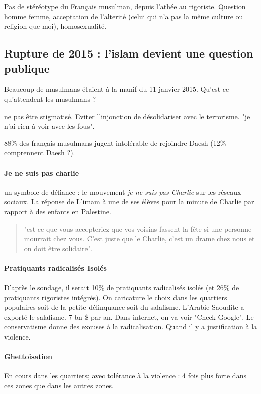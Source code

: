 \begin{Synthesis}
Pas de stéréotype du Français musulman, depuis l'athée au rigoriste. Question homme femme, acceptation de l'alterité (celui qui n'a pas la même culture ou religion que moi), homosexualité. 
\end{Synthesis}


\subsection{Rupture de 2015 : l'islam devient une question publique}

Beaucoup de musulmans étaient à la manif du 11 janvier 2015. 
Qu'est ce qu'attendent les musulmans ?
\bi
\item ne pas être stigmatisé. Eviter l'injonction de désolidariser avec le terrorisme. "je n'ai rien à voir avec les fous".
\item 88\% des français musulmans jugent intolérable de rejoindre Daesh (12\% comprennent Daesh ?).
\ei
\paragraph{Je ne suis pas charlie} un symbole de défiance : le mouvement \emph{je ne suis pas Charlie} sur les réseaux sociaux. La réponse de L'imam à une de ses élèves pour la minute de Charlie par rapport à des enfants en Palestine. 
\begin{quote}
"est ce que vous accepteriez que vos voisins fassent la fête si une personne mourrait chez vous. C'est juste que le Charlie, c'est un drame chez nous et on doit être solidaire".

\end{quote}

\paragraph{Pratiquants radicalisés Isolés} D'après le sondage, il serait 10\% de pratiquants radicalisés isolés (et 26\% de pratiquants rigoristes intégrés). 
On caricature le choix dans les quartiers populaires soit de la petite délinquance soit du salafisme. L'Arabie Saoudite a exporté le salafisme. 7 bn \$ par an. Dans internet, on va voir "Check Google". 
Le conservatisme donne des excuses à la radicalisation. Quand il y a justification à la violence. 
\paragraph{Ghettoisation} En cours dans les quartiers; avec tolérance à la violence : 4 fois plus forte dans ces zones que dans les autres zones.

